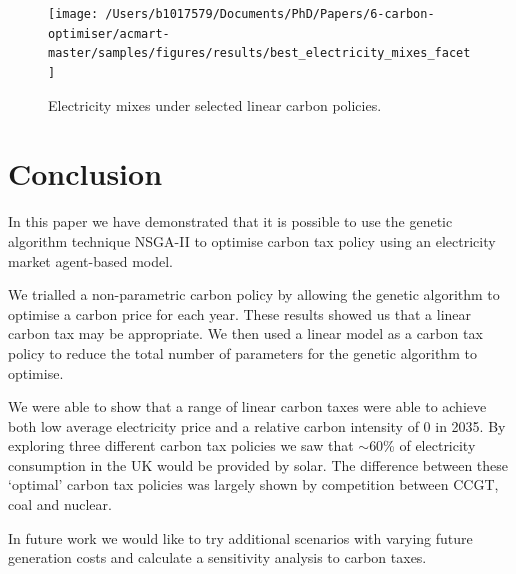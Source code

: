\documentclass[sigconf]{acmart}
\begin{document}
\begin{figure}
\centering
\texttt{[image: /Users/b1017579/Documents/PhD/Papers/6-carbon-optimiser/acmart-master/samples/figures/results/best\_electricity\_mixes\_facet]}
\caption{Electricity mixes under selected linear carbon policies.}
\label{fig:best_electricity_mixes_facet}
\end{figure}






\section{Conclusion}
\label{sec:conclusion}

In this paper we have demonstrated that it is possible to use the genetic algorithm technique NSGA-II to optimise carbon tax policy using an electricity market agent-based model. 

We trialled a non-parametric carbon policy by allowing the genetic algorithm to optimise a carbon price for each year. These results showed us that a linear carbon tax may be appropriate. We then used a linear model as a carbon tax policy to reduce the total number of parameters for the genetic algorithm to optimise.  

We were able to show that a range of linear carbon taxes were able to achieve both low average electricity price and a relative carbon intensity of 0 in 2035. By exploring three different carbon tax policies we saw that ${\sim}$60\% of electricity consumption in the UK would be provided by solar. The difference between these `optimal' carbon tax policies was largely shown by competition between CCGT, coal and nuclear.

In future work we would like to try additional scenarios with varying future generation costs and calculate a sensitivity analysis to carbon taxes.







\appendix
\end{document}

